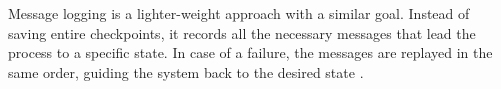 Message logging is a lighter-weight approach with a similar goal. Instead of saving entire checkpoints, it records all the necessary messages that lead the process to a specific state. In case of a failure, the messages are replayed in the same order, guiding the system back to the desired state \cite{Ledmi2018}.

\begin{comment}

\subsection{Evolution and the State-of-the-Art}

\todo[]{ajustar isto}

Fault tolerance has significantly evolved, with substantial advancements in both software and hardware techniques. As studied by Arshad A. et al. \cite{Hussein2021}, recent developments focus on leveraging novel technologies to enhance system resilience. Furthermore, with \gls{AI} and \gls{ML} has introduced predictive fault tolerance techniques that aim to anticipate and mitigate faults before they lead to system failures.

Current strategies can be categorized into three types:

\begin{itemize}
	
	\item \textbf{Reactive Strategies}: These methods aim to reduce the impact of faults after they occur. For instance, techniques like task migration on processor level \cite{Fochi2021} and checkpoint/restart mechanisms \cite{Hussain2021} allow systems to recover by either transferring tasks or restarting operations from saved states.
	      
	\item \textbf{Proactive Strategies}: Proactive methods focus on preventing faults by monitoring system conditions and taking preemptive actions. For example, Fayyaz et al. proposed a distributed satellite architecture that integrates fault-tolerant performance measurements to manage processor faults effectively \cite{Fayyaz2018}.
	      
	\item \textbf{Predictive Strategies}: With advancements in \gls{AI} and \gls{ML}, predictive fault tolerance has emerged as a cutting-edge approach, wherein algorithms forecast potential failures and initiate corrective measures. For instance, Ghosh et al. utilized a fault management subsystem within a transactive energy application to improve system resilience by analyzing interaction patterns \cite{Ghosh2021}.
	      
\end{itemize}

Several innovative techniques have been proposed to address specific challenges in fault tolerance. Examples include the use of erasure coding in distributed file systems to balance storage costs and redundancy \cite{Arafa2021}, adaptive learning for fault detection in multi-agent systems \cite{Khalili2021}, and circuit breaker patterns for fault recovery in stream processing architectures \cite{Knasmueller2021}. 
\end{comment}

